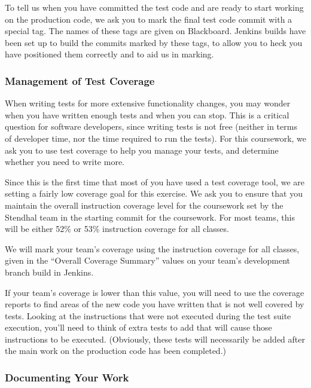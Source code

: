 \documentclass[
]{book}
\begin{document}
To tell us when you have committed the test code and are ready to start working on the production code, we ask you to mark the final test code commit with a special tag. The names of these tags are given on Blackboard. Jenkins builds have been set up to build the commits marked by these tags, to allow you to heck you have positioned them correctly and to aid us in marking.

\hypertarget{testcov}{%
\subsubsection*{Management of Test Coverage}\label{testcov}}

When writing tests for more extensive functionality changes, you may wonder when you have written enough tests and when you can stop. This is a critical question for software developers, since writing tests is not free (neither in terms of developer time, nor the time required to run the tests). For this coursework, we ask you to use test coverage to help you manage your tests, and determine whether you need to write more.

Since this is the first time that most of you have used a test coverage tool, we are setting a fairly low coverage goal for this exercise. We ask you to ensure that you maintain the overall instruction coverage level for the coursework set by the Stendhal team in the starting commit for the coursework. For most teams, this will be either 52\% or 53\% instruction coverage for all classes.

We will mark your team's coverage using the instruction coverage for all classes, given in the ``Overall Coverage Summary'' values on your team's development branch build in Jenkins.

If your team's coverage is lower than this value, you will need to use the coverage reports to find areas of the new code you have written that is not well covered by tests. Looking at the instructions that were not executed during the test suite execution, you'll need to think of extra tests to add that will cause those instructions to be executed.
(Obviously, these tests will necessarily be added after the main work on the production code has been completed.)

\hypertarget{docuwork}{%
\subsubsection*{Documenting Your Work}\label{docuwork}}
\end{document}
